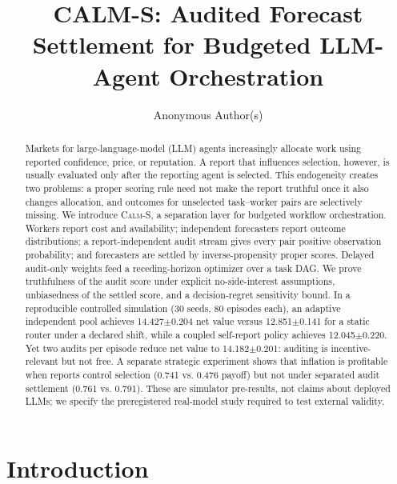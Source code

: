 \documentclass[sigconf,anonymous,review]{acmart}
\newcommand{\calms}{\textsc{Calm-S}}
\begin{document}
\title{CALM-S: Audited Forecast Settlement for Budgeted LLM-Agent Orchestration}

\author{Anonymous Author(s)}

\begin{abstract}
Markets for large-language-model (LLM) agents increasingly allocate work using
reported confidence, price, or reputation. A report that influences selection,
however, is usually evaluated only after the reporting agent is selected. This
endogeneity creates two problems: a proper scoring rule need not make the report
truthful once it also changes allocation, and outcomes for unselected
task--worker pairs are selectively missing. We introduce \calms{}, a separation
layer for budgeted workflow orchestration. Workers report cost and availability;
independent forecasters report outcome distributions; a report-independent audit
stream gives every pair positive observation probability; and forecasters are
settled by inverse-propensity proper scores. Delayed audit-only weights feed a
receding-horizon optimizer over a task DAG. We prove truthfulness of the audit
score under explicit no-side-interest assumptions, unbiasedness of the settled
score, and a decision-regret sensitivity bound. In a reproducible controlled
simulation (30 seeds, 80 episodes each), an adaptive independent pool achieves
14.427$\pm$0.204 net value versus 12.851$\pm$0.141 for a static router under a
declared shift, while a coupled self-report policy achieves 12.045$\pm$0.220.
Yet two audits per episode reduce net value to 14.182$\pm$0.201: auditing is
incentive-relevant but not free. A separate strategic experiment shows that
inflation is profitable when reports control selection (0.741 vs. 0.476 payoff)
but not under separated audit settlement (0.761 vs. 0.791). These are simulator
pre-results, not claims about deployed LLMs; we specify the preregistered
real-model study required to test external validity.
\end{abstract}


\maketitle

\section{Introduction}
\end{document}
